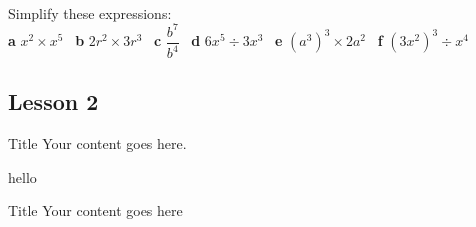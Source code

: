 \documentclass[fleqn, twoside]{article}
\begin{document}


\begin{examplebox}{}{}
    \\ %
    Simplify these expressions:                                 \\
    \textbf{a}\hspace{2mm} $x^2 \times x^5$        \hspace{7mm} \
    \textbf{b}\hspace{2mm} $2r^2 \times 3r^3$      \hspace{7mm} \
    \textbf{c}\hspace{2mm} $\dfrac{b^7}{b^4}$      \hspace{7mm} \
    \textbf{d}\hspace{2mm} $6x^5 \div 3x^3$        \hspace{7mm} \
    \textbf{e}\hspace{2mm} $(a^3)^3 \times 2a^2$   \hspace{7mm} \
    \textbf{f}\hspace{2mm} $(3x^2)^3 \div x^4$
\end{examplebox}


\subsection{Lesson 2}
\begin{note*}{Title}{}
    Your content goes here.
\end{note*}

\begin{examplebox}{}{}
    hello
\end{examplebox}


\exercise{}

\newpage

\begin{mybox2}[colbacktitle=WildStrawberry]{Title}
    Your content goes here
\end{mybox2}
\end{document}
